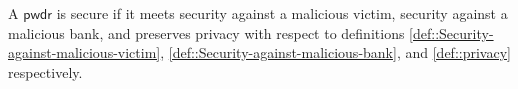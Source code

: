 


\begin{definition}[Security]\label{def::PwDR-security}
A $\mathsf{pwdr}$ is secure if it meets security against a malicious victim,  security against a malicious bank, and preserves privacy with respect to definitions \ref{def::Security-against-malicious-victim}, \ref{def::Security-against-malicious-bank}, and \ref{def::privacy} respectively. 
\end{definition}




%  
%  
%   
%   
%   
%   
%   
%
%
%  
%
%
%
%
%













